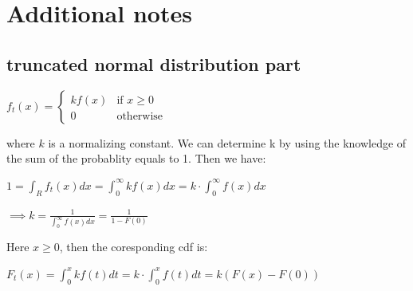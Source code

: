 \chapter{Additional notes}
\section{truncated normal distribution part}

\begin{center}
	$f_t(x) = \begin{cases} k f(x) & \text{if } x \geqslant 0 \\ 0   & \text{otherwise } \end{cases}$
\end{center}

where $k$ is a normalizing constant. We can determine k by using the knowledge of the sum of the probablity equals to 1. Then we have: 

\begin{center}
	
	$1 = \int_{R}f_t(x) dx = \int_{0}^{\infty} k f(x)dx = k \cdot \int_{0}^{\infty} f(x) dx$
	
\end{center}

\begin{center}
	
	$\implies k = \frac{1}{\int_{0}^{\infty}f(x) dx } = \frac{1}{1 - F(0)}$
	
\end{center}

Here $x \geqslant 0 $, then the coresponding cdf is:
\begin{center}
	$F_t(x) = \int_{0}^{x} kf(t) dt =  k \cdot \int_{0}^{x} f(t) dt = k(F(x) - F(0))$
\end{center}






